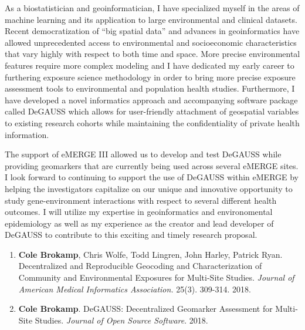 \documentclass{nihbiosketch}
\begin{document}
\begin{statement}

  As a biostatistician and geoinformatician, I have specialized myself in the
  areas of machine learning and its application to large environmental and
  clinical datasets. Recent democratization of “big spatial data” and advances in
  geoinformatics have allowed unprecedented access to environmental and
  socioeconomic characteristics that vary highly with respect to both time and
  space. More precise environmental features require more complex modeling and I
  have dedicated my early career to furthering exposure science methodology in
  order to bring more precise exposure assessment tools to environmental and
  population health
  studies. Furthermore, I have developed a novel informatics approach and
  accompanying software package called DeGAUSS which allows for user-friendly
  attachment of geospatial variables to existing research cohorts while
  maintaining the confidentiality of private health information.

  The support of eMERGE III allowed us to develop and test DeGAUSS while
  providing geomarkers that are currently being used across several eMERGE
  sites.  I look forward to continuing to support the use of DeGAUSS within
  eMERGE by helping the investigators capitalize on our unique and innovative
  opportunity to study gene-environment interactions with respect to several
  different health outcomes. I will utilize my expertise in geoinformatics and environomental
  epidemiology as well as my experience as the creator and lead developer of
  DeGAUSS to contribute to this exciting and timely research proposal. \\

  \begin{enumerate}

	\item \textbf{Cole Brokamp}, Chris Wolfe, Todd Lingren, John Harley, Patrick Ryan. Decentralized and Reproducible Geocoding and Characterization of Community and Environmental Exposures for Multi-Site Studies. \textit{Journal of American Medical Informatics Association.} 25(3). 309-314. 2018.
    
	\item \textbf{Cole Brokamp}. DeGAUSS: Decentralized Geomarker Assessment for Multi-Site Studies. \textit{Journal of Open Source Software}. 2018. 

  \end{enumerate}

\end{statement}
\end{document}
